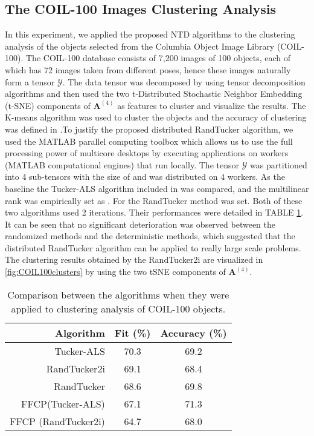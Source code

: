 \documentclass[10pt,twocolumn,twoside]{IEEEtran}
\newcommand{\tensor}[1]{\ensuremath{\boldsymbol{\mathscr{#1}}}}
\newcommand{\matn}[2][n]{\ensuremath{\mathbf{#2}^{(#1)}}}
\begin{document}
\subsection{The COIL-100 Images Clustering Analysis}
In this experiment, we applied the proposed NTD algorithms to the clustering analysis of the objects selected from the Columbia Object Image Library (COIL-100).  The COIL-100 database consists of 7,200 images of 100 objects, each of which has 72 images taken from different poses, hence these images naturally form a  tensor \tensor{Y}. The data tensor was decomposed by using tensor decomposition algorithms and then used the two t-Distributed Stochastic Neighbor Embedding (t-SNE) components of \matn[4]{A} as features to cluster and visualize the results. The K-means algorithm was used to cluster the objects and the accuracy of clustering was defined in  \cite{GNMF2011PAMI}.To justify the proposed distributed RandTucker algorithm, we used the MATLAB parallel computing toolbox which allows us to use the full processing power of multicore desktops by executing applications on workers (MATLAB computational engines) that run locally. The tensor \tensor{Y} was partitioned into 4 sub-tensors with the size of  and was distributed on 4 workers. As the baseline the Tucker-ALS algorithm included in \cite{KoldaTensorToolbox} was compared, and the multilinear rank was empirically set as . For the RandTucker method  was set. Both of these two algorithms used 2 iterations. Their performances were detailed in TABLE \ref{tab:simuCOIL}. It can be seen that no significant deterioration was observed between the randomized methods and the deterministic methods, which suggested that the distributed RandTucker algorithm can be applied to really large scale problems. The clustering results obtained by the RandTucker2i \figurename are visualized in \figurename \ref{fig:COIL100clusters} by using the two tSNE components of \matn[4]{A}.


\begin{table}
  \caption{Comparison between the algorithms when they were applied to clustering analysis of COIL-100 objects.}
  \label{tab:simuCOIL}
  \centering
  \begin{tabular}{ r  c c } \hline \hline
  Algorithm & Fit (\%) & Accuracy (\%) \\ \hline
 Tucker-ALS & 70.3 & 69.2 \\
 RandTucker2i & 69.1 & 68.4 \\
  RandTucker & 68.6 & 69.8 \\
 FFCP(Tucker-ALS) & 67.1 & 71.3 \\
 FFCP (RandTucker2i) & 64.7 & 68.0 \\ 
 \hline \hline
  \end{tabular}
  \end{table}
\end{document}
